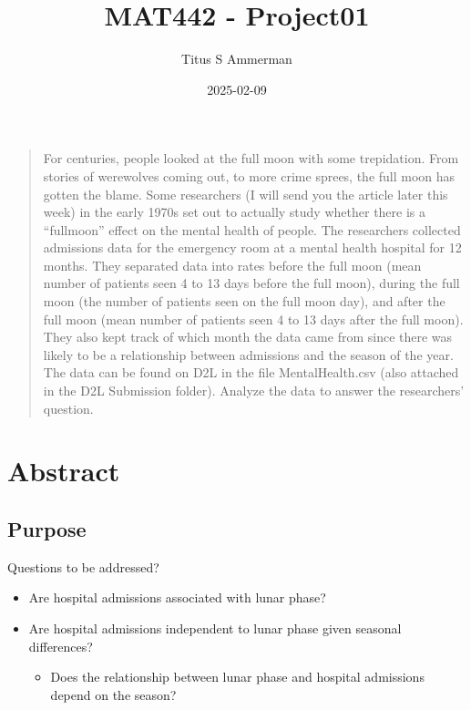 \documentclass[
]{article}
\title{MAT442 - Project01}
\author{Titus S Ammerman}
\date{2025-02-09}
\providecommand{\tightlist}{%
  \setlength{\itemsep}{0pt}\setlength{\parskip}{0pt}}
\begin{document}
\maketitle

\begin{quote}
For centuries, people looked at the full moon with some trepidation.
From stories of werewolves coming out, to more crime sprees, the full
moon has gotten the blame. Some researchers (I will send you the article
later this week) in the early 1970s set out to actually study whether
there is a ``fullmoon'' effect on the mental health of people. The
researchers collected admissions data for the emergency room at a mental
health hospital for 12 months. They separated data into rates before the
full moon (mean number of patients seen 4 to 13 days before the full
moon), during the full moon (the number of patients seen on the full
moon day), and after the full moon (mean number of patients seen 4 to 13
days after the full moon). They also kept track of which month the data
came from since there was likely to be a relationship between admissions
and the season of the year. The data can be found on D2L in the file
MentalHealth.csv (also attached in the D2L Submission folder). Analyze
the data to answer the researchers' question.
\end{quote}

\section{Abstract}\label{abstract}

\subsection{Purpose}\label{purpose}

Questions to be addressed?

\begin{itemize}
\tightlist
\item
  Are hospital admissions associated with lunar phase?
\item
  Are hospital admissions independent to lunar phase given seasonal
  differences?

  \begin{itemize}
  \tightlist
  \item
    Does the relationship between lunar phase and hospital admissions
    depend on the season?
  \end{itemize}
\end{itemize}
\end{document}
